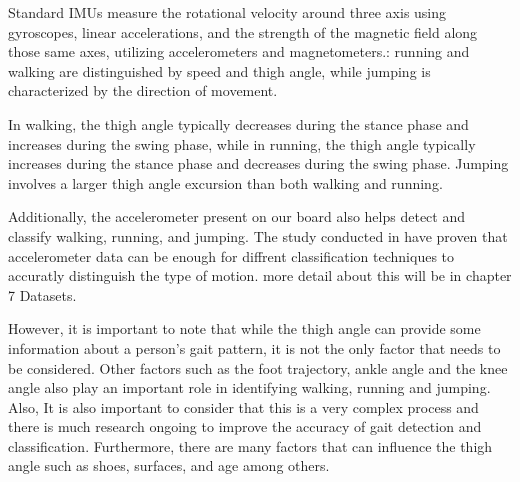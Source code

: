 Standard IMUs measure the rotational velocity around three axis using gyroscopes, linear accelerations, and the strength of the magnetic field along those same axes, utilizing accelerometers and magnetometers.: running and walking are distinguished by speed and thigh angle, while jumping is characterized by the direction of movement.

In walking, the thigh angle typically decreases during the stance phase and increases during the swing phase, while in running, the thigh angle typically increases during the stance phase and decreases during the swing phase. Jumping involves a larger thigh angle excursion than both walking and running.

Additionally, the accelerometer present on our board  also helps detect and classify walking, running, and jumping. The study conducted in \cite{Kwapisz:2010}  have proven that accelerometer data can be enough for diffrent classification techniques to accuratly distinguish the type of motion. more detail about this will be in chapter 7 Datasets. 


However, it is important to note that while the thigh angle can provide some information about a person's gait pattern, it is not the only factor that needs to be considered. Other factors such as the foot trajectory, ankle angle and the knee angle also play an important role in identifying walking, running and jumping. Also, It is also important to consider that this is a very complex process and there is much research ongoing to improve the accuracy of gait detection and classification. Furthermore, there are many factors that can influence the thigh angle such as shoes, surfaces, and age among others.




